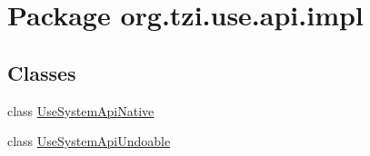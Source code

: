 \hypertarget{namespaceorg_1_1tzi_1_1use_1_1api_1_1impl}{\section{Package org.\-tzi.\-use.\-api.\-impl}
\label{namespaceorg_1_1tzi_1_1use_1_1api_1_1impl}
}
\subsection*{Classes}
\begin{DoxyCompactItemize}
\item 
class \hyperlink{classorg_1_1tzi_1_1use_1_1api_1_1impl_1_1_use_system_api_native}{Use\-System\-Api\-Native}
\item 
class \hyperlink{classorg_1_1tzi_1_1use_1_1api_1_1impl_1_1_use_system_api_undoable}{Use\-System\-Api\-Undoable}
\end{DoxyCompactItemize}
